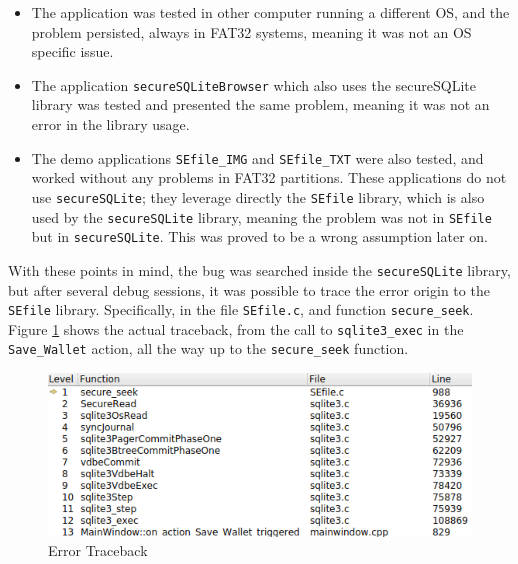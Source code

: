 \begin{itemize}
\setlength\itemsep{-3pt}

\item The application was tested in other computer running a different OS, and the problem persisted, always in FAT32 systems, meaning it was not an OS specific issue.
\item The application \texttt{secureSQLiteBrowser} which also uses the secureSQLite library was tested and presented the same problem, meaning it was not an error in the library usage.
\item The demo applications \texttt{SEfile\_IMG}  and \texttt{SEfile\_TXT} were also tested, and worked without any problems in FAT32 partitions. These applications do not use \texttt{secureSQLite}; they leverage directly the \texttt{SEfile} library, which is also used by the \texttt{secureSQLite} library, meaning the problem was not in \texttt{SEfile} but in \texttt{secureSQLite}. This was proved to be a wrong assumption later on.
\end{itemize}

With these points in mind, the bug was searched inside the \texttt{secureSQLite} library, but after several debug sessions, it was possible to trace the error origin to the \texttt{SEfile} library. Specifically, in the file \texttt{SEfile.c}, and function \texttt{secure\_seek}. Figure \ref{fig:traceback} shows the actual traceback, from the call to \texttt{sqlite3\_exec} in the \texttt{Save\_Wallet} action, all the way up to the \texttt{secure\_seek} function.

\begin{figure}[htb]
  \centering
  \captionsetup{justification=centering}
  \centerline{\includegraphics[width=0.8\columnwidth]{chapters/figures/development/traceback.png}}
  \caption{Error Traceback}
  \label{fig:traceback}
\end{figure}

